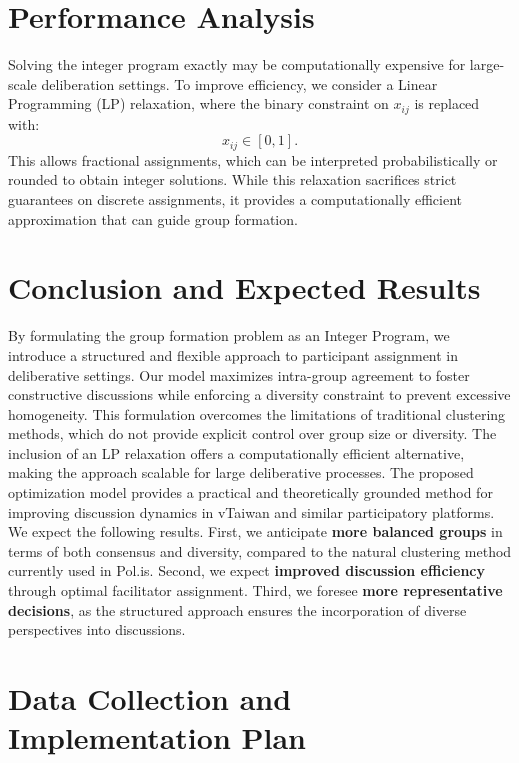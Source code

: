 \documentclass[11pt,a4paper]{article}
\begin{document}
\section{Performance Analysis}

Solving the integer program exactly may be computationally expensive for large-scale deliberation settings. To improve efficiency, we consider a Linear Programming (LP) relaxation, where the binary constraint on \( x_{ij} \) is replaced with:
\begin{equation}
    x_{ij} \in [0,1].
\end{equation}
This allows fractional assignments, which can be interpreted probabilistically or rounded to obtain integer solutions. While this relaxation sacrifices strict guarantees on discrete assignments, it provides a computationally efficient approximation that can guide group formation.

\section{Conclusion and Expected Results}

By formulating the group formation problem as an Integer Program, we introduce a structured and flexible approach to participant assignment in deliberative settings. Our model maximizes intra-group agreement to foster constructive discussions while enforcing a diversity constraint to prevent excessive homogeneity. This formulation overcomes the limitations of traditional clustering methods, which do not provide explicit control over group size or diversity. The inclusion of an LP relaxation offers a computationally efficient alternative, making the approach scalable for large deliberative processes. The proposed optimization model provides a practical and theoretically grounded method for improving discussion dynamics in vTaiwan and similar participatory platforms. 
We expect the following results. First, we anticipate \textbf{more balanced groups} in terms of both consensus and diversity, compared to the natural clustering method currently used in Pol.is. Second, we expect \textbf{improved discussion efficiency} through optimal facilitator assignment. Third, we foresee \textbf{more representative decisions}, as the structured approach ensures the incorporation of diverse perspectives into discussions.

\section{Data Collection and Implementation Plan}
\end{document}
